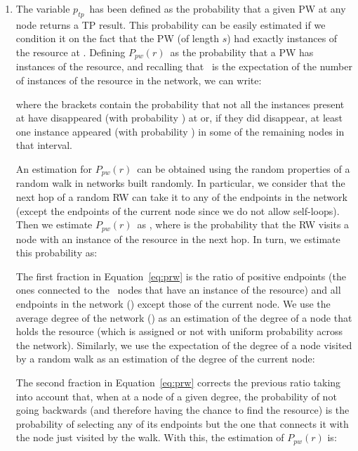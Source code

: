 \documentclass[]{elsarticle}
\newcommand{\s}		{\ensuremath{s}}		\newcommand{\sopt}	{\ensuremath{s_{opt}}}		\newcommand{\p}		{\ensuremath{p}}		\newcommand{\W}		{\ensuremath{W}}		\newcommand{\w}		{\ensuremath{w}}		\newcommand{\lsave}	{\ensuremath{\overline{l}_s}}	\newcommand{\lave}	{\ensuremath{\overline{l}}}	\newcommand{\lopt}	{\ensuremath{\overline{l}_{opt}}}
\newcommand{\ptp}       {\ensuremath{p_{t\!p}}}
\newcommand{\PWx}[1]    {\ensuremath{P_{pw}(#1)}}
\begin{document}
\begin{enumerate}
\item

The variable \ptp\ has been defined as the probability that a given PW at any node returns a TP result. This probability can be easily estimated if we condition it on the fact that the PW (of length \s) had exactly  instances of the resource at . Defining \PWx{r}\ as the probability that a PW has  instances of the resource, and recalling that \R\ is the expectation of the number of instances of the resource in the network, we can write:



\noindent where the brackets contain the probability that not all the  instances present at  have disappeared (with probability \pd) at  or, if they did disappear, at least one instance appeared (with probability \pa) in some of the  remaining nodes in that interval.

An estimation for \PWx{r}\ can be obtained using the random properties of a random walk in networks built randomly. In particular, we consider that the next hop of a random RW can take it to any of the endpoints in the network (except the endpoints of the current node since we do not allow self-loops). Then we estimate \PWx{r}\ as , where  is the probability that the RW visits a node with an instance of the resource in the next hop. In turn, we estimate this probability as:



\noindent The first fraction in Equation~\ref{eq:prw} is the ratio of positive endpoints (the ones connected to the \R\ nodes that have an instance of the resource) and all endpoints in the network () except those of the current node. We use the average degree of the network () as an estimation of the degree of a node that holds the resource (which is assigned or not with uniform probability  across the network). Similarly, we use the expectation of the degree of a node visited by a random walk as an estimation of the degree of the current node:



\noindent The second fraction in Equation~\ref{eq:prw} corrects the previous ratio taking into account that, when at a node of a given degree, the probability of not going backwards (and therefore having the chance to find the resource) is the probability of selecting any of its endpoints but the one that connects it with the node just visited by the walk.
With this, the estimation of \PWx{r} is:





\end{enumerate}
\end{document}
